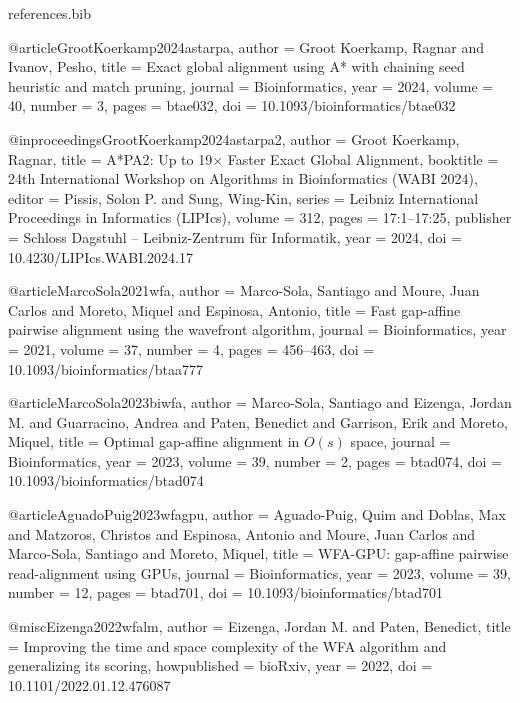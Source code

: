 \begin{filecontents*}[overwrite]{references.bib}

@article{GrootKoerkamp2024astarpa,
  author  = {Groot Koerkamp, Ragnar and Ivanov, Pesho},
  title   = {Exact global alignment using {A*} with chaining seed heuristic and match pruning},
  journal = {Bioinformatics},
  year    = {2024},
  volume  = {40},
  number  = {3},
  pages   = {btae032},
  doi     = {10.1093/bioinformatics/btae032}
}

@inproceedings{GrootKoerkamp2024astarpa2,
  author    = {Groot Koerkamp, Ragnar},
  title     = {{A*PA2}: Up to 19$\times$ Faster Exact Global Alignment},
  booktitle = {24th International Workshop on Algorithms in Bioinformatics (WABI 2024)},
  editor    = {Pissis, Solon P. and Sung, Wing-Kin},
  series    = {Leibniz International Proceedings in Informatics (LIPIcs)},
  volume    = {312},
  pages     = {17:1--17:25},
  publisher = {Schloss Dagstuhl -- Leibniz-Zentrum f{\"u}r Informatik},
  year      = {2024},
  doi       = {10.4230/LIPIcs.WABI.2024.17}
}

@article{MarcoSola2021wfa,
  author  = {Marco-Sola, Santiago and Moure, Juan Carlos and Moreto, Miquel and Espinosa, Antonio},
  title   = {Fast gap-affine pairwise alignment using the wavefront algorithm},
  journal = {Bioinformatics},
  year    = {2021},
  volume  = {37},
  number  = {4},
  pages   = {456--463},
  doi     = {10.1093/bioinformatics/btaa777}
}

@article{MarcoSola2023biwfa,
  author  = {Marco-Sola, Santiago and Eizenga, Jordan M. and Guarracino, Andrea and Paten, Benedict and
             Garrison, Erik and Moreto, Miquel},
  title   = {Optimal gap-affine alignment in {$O(s)$} space},
  journal = {Bioinformatics},
  year    = {2023},
  volume  = {39},
  number  = {2},
  pages   = {btad074},
  doi     = {10.1093/bioinformatics/btad074}
}

@article{AguadoPuig2023wfagpu,
  author  = {Aguado-Puig, Quim and Doblas, Max and Matzoros, Christos and Espinosa, Antonio and Moure, Juan Carlos
             and Marco-Sola, Santiago and Moreto, Miquel},
  title   = {{WFA-GPU}: gap-affine pairwise read-alignment using {GPUs}},
  journal = {Bioinformatics},
  year    = {2023},
  volume  = {39},
  number  = {12},
  pages   = {btad701},
  doi     = {10.1093/bioinformatics/btad701}
}

@misc{Eizenga2022wfalm,
  author       = {Eizenga, Jordan M. and Paten, Benedict},
  title        = {Improving the time and space complexity of the {WFA} algorithm and generalizing its scoring},
  howpublished = {bioRxiv},
  year         = {2022},
  doi          = {10.1101/2022.01.12.476087}
}


\end{filecontents*}
